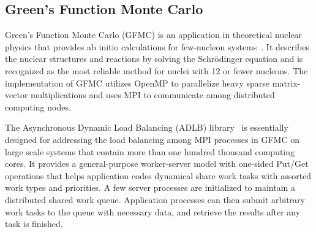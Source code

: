 
\subsection{Green’s Function Monte Carlo}

Green’s Function Monte Carlo (GFMC) is an application in theoretical nuclear
physics that provides ab initio calculations for few-nucleon systems~\cite{gfmc}.
It describes the nuclear structures and reactions by solving the
Schr\"{o}dinger equation and is recognized as the most reliable method
for nuclei with 12 or fewer nucleons. The implementation of GFMC utilizes
OpenMP to parallelize heavy sparse matrix-vector multiplications and
uses MPI to communicate among distributed computing nodes.

The Asynchronous Dynamic Load Balancing (ADLB) library~\cite{adlb} is
essentially designed for addressing the load balancing among MPI processes
in GFMC on large scale systems that contain more than one hundred thousand
computing cores. It provides a general-purpose worker-server model with
one-sided Put/Get operations that helps application codes dynamical
share work tasks with assorted work types and priorities. A few server
processes are initialized to maintain a distributed shared work queue.
Application processes can then submit arbitrary work tasks to the queue
with necessary data, and retrieve the results after any task is finished.
